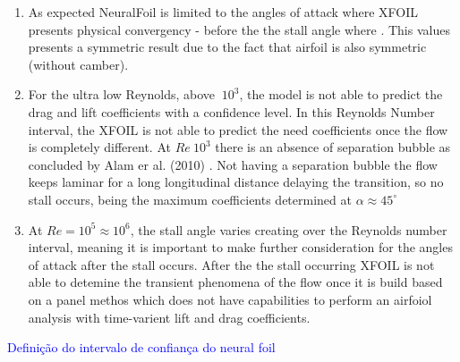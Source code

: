 \begin{enumerate}
    \item As expected NeuralFoil is limited to the angles of attack where XFOIL presents physical convergency - before the the stall angle where . This values presents a symmetric result due to the fact that airfoil is also symmetric (without camber).
    
    \item For the ultra low Reynolds, above $~ 10^3$, the model is not able to predict the drag and lift coefficients with a confidence level. In this Reynolds Number interval, the XFOIL is not able to predict the need coefficients once the flow is completely different. At $Re ~ 10^3$ there is an absence of separation bubble as  concluded by Alam er al. (2010) \cite{alam_ultra-low_2010}. Not having a separation bubble the flow keeps laminar for a long longitudinal distance delaying the transition, so no stall occurs, being the maximum coefficients determined at $\alpha \approx 45 ^{\circ}$
    
    \item At $Re = 10^5 \approx 10^6$, the stall angle varies creating over the Reynolds number interval, meaning it is important to make further consideration for the angles of attack after the stall occurs. After the the stall occurring XFOIL is not able to detemine the transient phenomena of the flow once it is build based on a panel methos which does not have capabilities to perform an airfoiol analysis with time-varient lift and drag coefficients.

\end{enumerate}


\textcolor{blue}{Definição do intervalo de confiança do neural foil}\\

